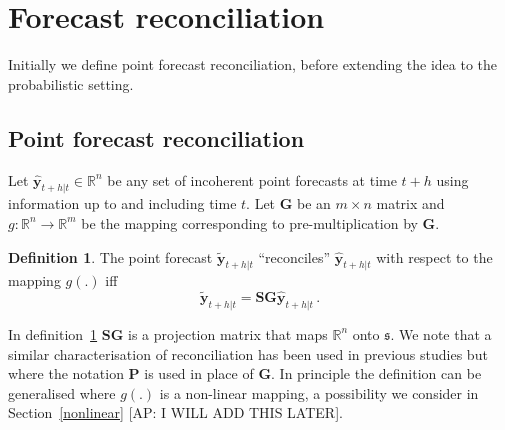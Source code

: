 \documentclass[a4paper, 11pt]{article}
\theoremstyle{theo}
\theoremstyle{definition}
\newtheorem{definition}{Definition}[section]
\begin{document}
\section{Forecast reconciliation}\label{sec:reconciliation}

Initially we define point forecast reconciliation, before extending the idea to the probabilistic setting.

\subsection{Point forecast reconciliation}


  Let $\hat{\bm{y}}_{t+h|t} \in \mathbb{R}^n$ be any set of incoherent point forecasts at time $t+h$ using information up to and including time $t$.  Let $\bm{G}$ be an $m\times n$ matrix and $g:\mathbb{R}^n \rightarrow \mathbb{R}^m$ be the mapping corresponding to pre-multiplication by $\bm{G}$.
  \begin{definition}\label{def:reconpoint}
  The point forecast $\tilde{\bm{y}}_{t+h|t}$ ``reconciles'' $\hat{\bm{y}}_{t+h|t}$ with respect to the mapping $g(.)$ iff
  \begin{equation}
    \tilde{\bm{y}}_{t+h|t}=\bm{S}\bm{G}\hat{\bm{y}}_{t+h|t}\,.
  \end{equation} 
    
\end{definition}

In definition~\ref{def:reconpoint}  $\bm{S}\bm{G}$ is a projection matrix that maps $\mathbb{R}^n$ onto $\mathfrak{s}$. We note that a similar characterisation of reconciliation has been used in previous studies but where the notation $\bm{P}$ is used in place of $\bm{G}$. In principle the definition can be generalised where $g(.)$ is a non-linear mapping, a possibility we consider in Section~\ref{nonlinear} {\color{red}[AP: I WILL ADD THIS LATER]}.
\end{document}
